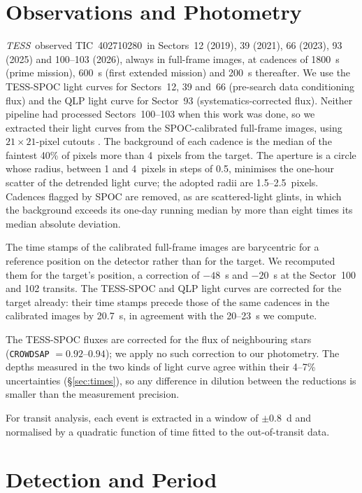 \documentclass[twocolumn]{aastex631}
\newcommand{\tic}{TIC~402710280}
\newcommand{\tess}{\textit{TESS}}
\begin{document}
\section{Observations and Photometry} \label{sec:data}

\tess\ observed \tic\ in Sectors~12 (2019), 39 (2021), 66 (2023), 93 (2025) and 100--103 (2026), always in full-frame images, at cadences of 1800~s (prime mission), 600~s (first extended mission) and 200~s thereafter. We use the TESS-SPOC light curves \citep{Caldwell2020, TESSSPOC} for Sectors~12, 39 and~66 (pre-search data conditioning flux) and the QLP light curve \citep{Huang2020a, QLPdata} for Sector~93 (systematics-corrected flux). Neither pipeline had processed Sectors~100--103 when this work was done, so we extracted their light curves from the SPOC-calibrated full-frame images, using $21 \times 21$-pixel cutouts \citep{Brasseur2019}. The background of each cadence is the median of the faintest 40\% of pixels more than 4~pixels from the target. The aperture is a circle whose radius, between 1 and 4~pixels in steps of 0.5, minimises the one-hour scatter of the detrended light curve; the adopted radii are 1.5--2.5~pixels. Cadences flagged by SPOC are removed, as are scattered-light glints, in which the background exceeds its one-day running median by more than eight times its median absolute deviation.

The time stamps of the calibrated full-frame images are barycentric for a reference position on the detector rather than for the target. We recomputed them for the target's position, a correction of $-48$~s and $-20$~s at the Sector~100 and 102 transits. The TESS-SPOC and QLP light curves are corrected for the target already: their time stamps precede those of the same cadences in the calibrated images by 20.7~s, in agreement with the 20--23~s we compute.

The TESS-SPOC fluxes are corrected for the flux of neighbouring stars (\texttt{CROWDSAP} $= 0.92$--$0.94$); we apply no such correction to our photometry. The depths measured in the two kinds of light curve agree within their 4--7\% uncertainties (\S\ref{sec:times}), so any difference in dilution between the reductions is smaller than the measurement precision.

For transit analysis, each event is extracted in a window of $\pm 0.8$~d and normalised by a quadratic function of time fitted to the out-of-transit data.

\section{Detection and Period} \label{sec:period}
\end{document}

